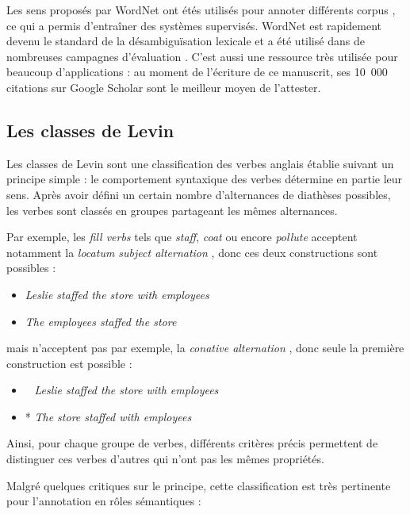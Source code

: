 Les sens proposés par WordNet ont étés utilisés pour annoter différents corpus
\citep{petrolito2014survey}, ce qui a permis d'entraîner des systèmes
supervisés. WordNet est rapidement devenu le standard de la désambiguïsation
lexicale et a été utilisé dans de nombreuses campagnes d'évaluation
\citep{navigli2009word}. C'est aussi une ressource très utilisée pour beaucoup
d'applications : au moment de l'écriture de ce manuscrit, ses 10~000 citations
sur Google Scholar sont le meilleur moyen de l'attester.

\subsection{Les classes de Levin}
\label{presentation_levin}

Les classes de Levin \citep{levin1993english} sont une classification des
verbes anglais établie suivant un principe simple : le comportement syntaxique
des verbes détermine en partie leur sens. Après avoir défini un certain nombre
d'alternances de diathèses possibles, les verbes sont classés en groupes
partageant les mêmes alternances.

Par exemple, les \textit{fill verbs} tels que \textit{staff}, \textit{coat} ou encore
\textit{pollute} \citep[p.~119]{levin1993english} acceptent notamment la
\textit{locatum subject alternation} \citep[p.~85]{levin1993english}, donc ces
deux constructions sont possibles :

\begin{itemize}
    \item \textit{Leslie staffed the store with employees}
    \item \textit{The employees staffed the store}
\end{itemize}

mais n'acceptent pas par exemple, la \textit{conative alternation}
\citep[p.~41]{levin1993english}, donc seule la première construction est
possible :

\begin{itemize}
    \item ~ \textit{Leslie staffed the store with employees}
    \item * \textit{The store staffed with employees}
\end{itemize}

Ainsi, pour chaque groupe de verbes, différents critères précis permettent de
distinguer ces verbes d'autres qui n'ont pas les mêmes propriétés.

Malgré quelques critiques \citep{riemer2011conception} sur le principe, cette
classification est très pertinente pour l'annotation en rôles sémantiques :

